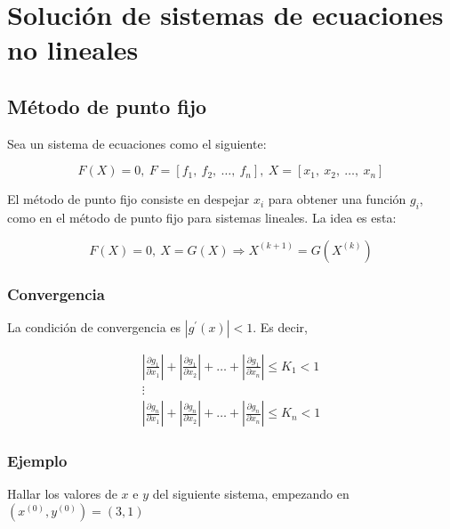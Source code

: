 \documentclass{article}
\begin{document}
\section{Solución de sistemas de ecuaciones no lineales}

\subsection{Método de punto fijo}

Sea un sistema de ecuaciones como el siguiente:

\begin{equation*}
    F(X) = 0,\ F = \left[f_1,\ f_2,\ \dots,\ f_n\right],\ X = \left[x_1,\ x_2,\ \dots,\ x_n\right]
\end{equation*}

El método de punto fijo consiste en despejar $x_i$ para obtener una función 
$g_i$, como en el método de punto fijo para sistemas lineales. La idea es esta:

\begin{equation*}
    F(X) = 0,\ X = G(X) \Longrightarrow X^{(k+1)} = G\left(X^{(k)}\right)
\end{equation*}

\subsubsection{Convergencia}

La condición de convergencia es  $\left|g^{\prime}(x)\right|<1$. Es decir,

\begin{equation*}
\begin{split}
    \left|\frac{\partial g_1}{\partial x_1}\right| + \left|\frac{\partial g_1}{\partial x_2}\right| + \dots + \left|\frac{\partial g_1}{\partial x_n}\right| \leq K_1 < 1 \\
    \vdots \\
    \left|\frac{\partial g_n}{\partial x_1}\right| + \left|\frac{\partial g_n}{\partial x_2}\right| + \dots + \left|\frac{\partial g_n}{\partial x_n}\right| \leq K_n < 1
\end{split}    
\end{equation*}

\subsubsection{Ejemplo}

Hallar los valores de $x$ e $y$ del siguiente sistema, empezando en $(x^{(0)}, y^{(0)}) = (3,1)$
\end{document}

